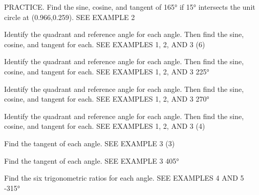 \documentclass{article}
\newenvironment{practice}[2]{}{}        %
\newcommand{\answer}[1]{}               %
\newcommand{\te}[1]{}                   %
\begin{document}
\begin{practice}{20}{2}
PRACTICE. Find the sine, cosine, and tangent of 165° if 15° intersects the unit circle at (0.966,0.259). SEE EXAMPLE 2
\answer{(\sin165°=0.259), (\cos165°=-0.966), (\tan165°=-0.268)}
\end{practice}
\begin{practice}{21}{1}
Identify the quadrant and reference angle for each angle. Then find the sine, cosine, and tangent for each. SEE EXAMPLES 1, 2, AND 3
(\frac{5\pi}6)
\answer{Quadrant II; (\sin\frac{5\pi}6=\frac12); (\cos=\frac{5\pi}6=-\frac{\sqrt3}{2}); (\tan\frac{5\pi}6=-\frac1{\sqrt3}=-\frac{\sqrt3}{3})}
\te{Printed extra equals sign after cos; likely (\cos\frac{5\pi}6). Printed answer omits the requested reference angle.}
\end{practice}
\begin{practice}{22}{1}
Identify the quadrant and reference angle for each angle. Then find the sine, cosine, and tangent for each. SEE EXAMPLES 1, 2, AND 3
225°
\answer{Quadrant III; (\sin225°=-\frac{\sqrt2}{2}); (\cos225°=-\frac{\sqrt2}{2}); (\tan225°=1)}
\te{Printed answer omits the requested reference angle.}
\end{practice}
\begin{practice}{23}{1}
Identify the quadrant and reference angle for each angle. Then find the sine, cosine, and tangent for each. SEE EXAMPLES 1, 2, AND 3
270°
\answer{y-axis; (\sin270°=-1); (\cos270°=0); coordinates of terminal point are (0,-1); (\tan270°) is undefined}
\end{practice}
\begin{practice}{24}{1}
Identify the quadrant and reference angle for each angle. Then find the sine, cosine, and tangent for each. SEE EXAMPLES 1, 2, AND 3
(\frac{29\pi}4)
\answer{Quadrant III; (\sin\frac{29\pi}4=-\frac{\sqrt2}{2}); (\cos\frac{29\pi}4=-\frac{\sqrt2}{2}); (\tan\frac{29\pi}4=1)}
\te{Printed answer omits the requested reference angle.}
\end{practice}
\begin{practice}{25}{1}
Find the tangent of each angle. SEE EXAMPLE 3
(\frac{7\pi}3)
\answer{(\tan\frac{7\pi}3=\sqrt3)}
\end{practice}
\begin{practice}{26}{1}
Find the tangent of each angle. SEE EXAMPLE 3
405°
\answer{(\tan405°=1)}
\end{practice}
\begin{practice}{27}{1}
Find the six trigonometric ratios for each angle. SEE EXAMPLES 4 AND 5
-315°
\answer{(\sin(-315°)=\frac{\sqrt2}{2}); (\cos(-315°)=\frac{\sqrt2}{2}); (\tan(-315°)=1); (\sec(-315°)=\sqrt2); (\csc(-315°)=\sqrt2); (\cot(-315°)=1)}
\end{practice}
\end{document}
